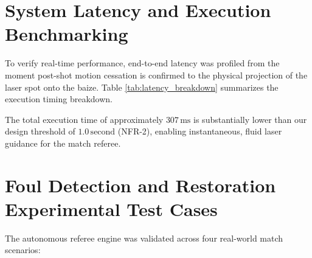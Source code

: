 \section{System Latency and Execution Benchmarking}
To verify real-time performance, end-to-end latency was profiled from the moment post-shot motion cessation is confirmed to the physical projection of the laser spot onto the baize. Table \ref{tab:latency_breakdown} summarizes the execution timing breakdown.

\begin{table}[H]
\centering
\caption{End-to-End Latency Breakdown for Ball Restoration Pipeline}
\label{tab:latency_breakdown}
\end{table}

The total execution time of approximately $307\,\text{ms}$ is substantially lower than our design threshold of $1.0\,\text{second}$ (NFR-2), enabling instantaneous, fluid laser guidance for the match referee.

\section{Foul Detection and Restoration Experimental Test Cases}
The autonomous referee engine was validated across four real-world match scenarios:

